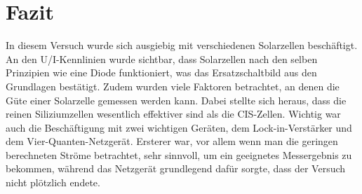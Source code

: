 

\chapter{Fazit}
\label{chap:fazit}


In diesem Versuch wurde sich ausgiebig mit verschiedenen Solarzellen beschäftigt. An den U/I-Kennlinien wurde sichtbar, dass Solarzellen nach den 
selben Prinzipien wie eine Diode funktioniert, was das Ersatzschaltbild aus den Grundlagen bestätigt. Zudem wurden viele Faktoren betrachtet, 
an denen die Güte einer Solarzelle gemessen werden kann. Dabei stellte sich heraus, dass die reinen Siliziumzellen wesentlich effektiver
sind als die CIS-Zellen. Wichtig war auch die Beschäftigung mit zwei wichtigen Geräten, dem Lock-in-Verstärker und dem 
Vier-Quanten-Netzgerät. Ersterer war, vor allem wenn man die geringen berechneten Ströme betrachtet, sehr sinnvoll, um ein geeignetes 
Messergebnis zu bekommen, während das Netzgerät grundlegend dafür sorgte, dass der Versuch nicht plötzlich endete.